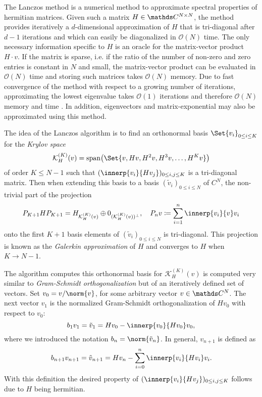The Lanczos method is a numerical method to approximate spectral properties of hermitian matrices. 
Given such a matrix \(H \in \C^{N\times N}\), the method provides iteratively a \(d\)-dimensional approximation of \(H\) that is tri-diagonal after \(d-1\) iterations and which can easily be diagonalized in \(\mathcal{O}(N)\) time.
The only necessary information specific to \(H\) is an oracle for the matrix-vector product \(H\cdot v\).
If the matrix is sparse, i.e. if the ratio of the number of non-zero and zero entries is constant in \(N\) and small, the matrix-vector product can be evaluated in \(\mathcal{O}(N)\) time and storing such matrices takes \(\mathcal{O}(N)\) memory. 
Due to fast convergence of the method with respect to a growing number of iterations, approximating the lowest eigenvalue takes \(\mathcal{O}(1)\) iterations and therefore \(\mathcal{O}(N)\) memory and time \cite{kocherikLanczosMethod2015}.
In addition, eigenvectors and matrix-exponential may also be approximated using this method. 

The idea of the Lanczos algorithm is to find an orthonormal basis \(\Set{v_i}_{0\leq i \leq K}\) for the \emph{Krylov space}
\begin{equation}
    \mathcal{K}^{(K)}_H(v) = \vecspan\of*{\Set{v, Hv, H^2v, H^3v, \dots, H^K v}}
\end{equation}
of order \(K \leq N-1\) such that \((\innerp{v_i}{H v_j})_{0 \leq i,j \leq K}\) is a tri-diagonal matrix. 
Then when extending this basis to a basis \((\tilde v_i)_{0\leq i \leq N}\) of \(C^N\), the non-trivial part of the projection 
\begin{equation}
    P_{K+1} H P_{K+1} = H_{\mathcal{K}^{(K)}_H(v)} \oplus 0_{(\mathcal{K}^{(K)}_H(v))^\perp}, \quad P_n v \coloneq \sum_{i=1}^n \innerp{v_i}{v} v_i
\end{equation}
onto the first \(K+1\) basis elements of \((\tilde{v}_i)_{0\leq i \leq N}\) is tri-diagonal. 
This projection is known as the \emph{Galerkin approximation} of \(H\) and converges to \(H\) when \(K \to N-1\).

The algorithm computes this orthonormal basis for \(\mathcal{K}^{(K)}_H(v)\) is computed very similar to \emph{Gram-Schmidt orthogonalization} but of an iteratively defined set of vectors. 
Set \(v_0 = v / \norm{v}\), for some arbitrary vector \(v\in\C^N\). 
The next vector \(v_1\) is the normalized Gram-Schmidt orthogonalization of \(H v_0\) with respect to \(v_0\):
\begin{equation}
    b_1 v_1 = \tilde v_1 = H v_0 - \innerp{v_0}{H v_0} v_0
    ,
\end{equation}
where we introduced the notation \(b_n = \norm{\tilde v_n}\).
In general, \(v_{n+1}\) is defined as 
\begin{equation}
    b_{n+1} v_{n+1} = \tilde v_{n+1} = H v_n - \sum_{i=0}^n \innerp{v_i}{H v_i} v_i
    .
\end{equation}
With this definition the desired property of \((\innerp{v_i}{H v_j})_{0 \leq i,j \leq K}\) follows due to \(H\) being hermitian.


